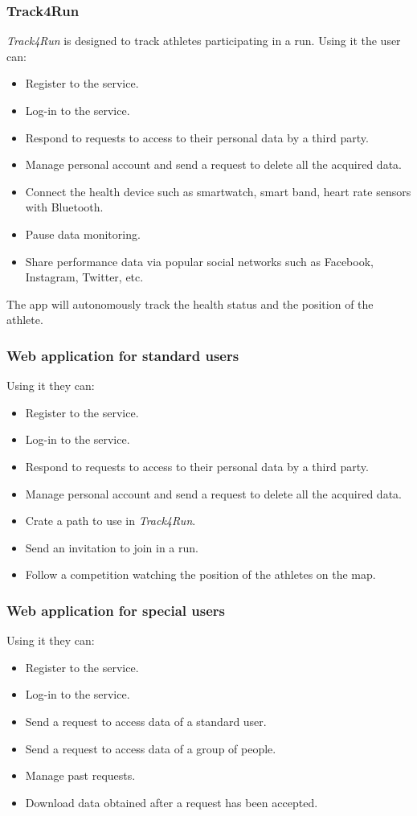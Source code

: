 \subsubsection{Track4Run}
\textit{Track4Run} is designed to track athletes participating in a run.
Using it the user can:
\begin{itemize}
\item Register to the service.
\item Log-in to the service.
\item Respond to requests to access to their personal data by a third party.
\item Manage personal account and send a request to delete all the acquired data.
\item Connect the health device such as smartwatch, smart band, heart rate sensors with Bluetooth.
\item Pause data monitoring.
\item Share performance data via popular social networks such as Facebook, Instagram, Twitter, etc.
\end{itemize}
The app will autonomously track the health status and the position of the athlete.

\subsubsection{Web application for standard users}
Using it they can:
\begin{itemize}
\item Register to the service.
\item Log-in to the service.
\item Respond to requests to access to their personal data by a third party.
\item Manage personal account and send a request to delete all the acquired data.
\item Crate a path to use in \textit{Track4Run}.
\item Send an invitation to join in a run.
\item Follow a competition watching the position of the athletes on the map.
\end{itemize}

\subsubsection{Web application for special users}
Using it they can:
\begin{itemize}
\item Register to the service.
\item Log-in to the service.
\item Send a request to access data of a standard user.
\item Send a request to access data of a group of people.
\item Manage past requests.
\item Download data obtained after a request has been accepted.
\end{itemize}


